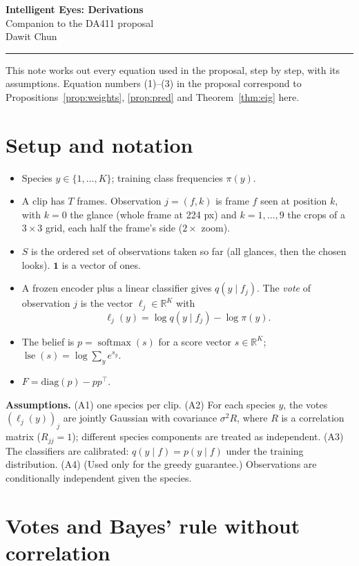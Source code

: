 \documentclass[11pt]{article}
\theoremstyle{plain}
\theoremstyle{remark}
\newcommand{\one}{\mathbf{1}}
\newcommand{\lse}{\operatorname{lse}}
\begin{document}
\begin{center}
{\sffamily\bfseries\LARGE Intelligent Eyes: Derivations}\\[4pt]
{\sffamily\large Companion to the DA411 proposal}\\[8pt]
Dawit Chun
\end{center}
\noindent\rule{\textwidth}{0.4pt}

This note works out every equation used in the proposal, step by step, with its assumptions. Equation numbers (1)--(3) in the proposal correspond to Propositions~\ref{prop:weights}, \ref{prop:pred} and Theorem~\ref{thm:eig} here.

\section{Setup and notation}

\begin{itemize}
  \item Species $y\in\{1,\dots,K\}$; training class frequencies $\pi(y)$.
  \item A clip has $T$ frames. Observation $j=(f,k)$ is frame $f$ seen at position $k$, with $k=0$ the glance (whole frame at 224 px) and $k=1,\dots,9$ the crops of a $3\times3$ grid, each half the frame's side ($2\times$ zoom).
  \item $S$ is the ordered set of observations taken so far (all glances, then the chosen looks). $\one$ is a vector of ones.
  \item A frozen encoder plus a linear classifier gives $q(y\mid f_j)$. The \emph{vote} of observation $j$ is the vector $\ell_j\in\mathbb R^K$ with
  \[ \ell_j(y)=\log q(y\mid f_j)-\log\pi(y). \]
  \item The belief is $p=\operatorname{softmax}(s)$ for a score vector $s\in\mathbb R^K$; $\lse(s)=\log\sum_y e^{s_y}$.
  \item $F=\mathrm{diag}(p)-pp^\top$.
\end{itemize}

\textbf{Assumptions.}
(A1) one species per clip.
(A2) For each species $y$, the votes $(\ell_j(y))_j$ are jointly Gaussian with covariance $\sigma^2R$, where $R$ is a correlation matrix ($R_{jj}=1$); different species components are treated as independent.
(A3) The classifiers are calibrated: $q(y\mid f)=p(y\mid f)$ under the training distribution.
(A4) (Used only for the greedy guarantee.) Observations are conditionally independent given the species.

\section{Votes and Bayes' rule without correlation}
\end{document}
